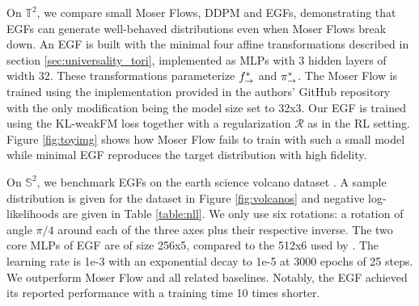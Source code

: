 \documentclass{article}
\theoremstyle{plain}
\theoremstyle{definition}
\theoremstyle{remark}
\theoremstyle{fact}
\begin{document}
 On $\mathbb{T}^2$, we compare small Moser Flows, DDPM and EGFs, demonstrating that EGFs can generate well-behaved distributions even when Moser Flows break down.
 An EGF is built with the minimal four affine transformations described in section \ref{sec:universality_tori}, implemented as MLPs with 3 hidden layers of width 32. These transformations parameterize $f^*_{\rightarrow}$ and $\pi_{\rightarrow}^*$. The Moser Flow is trained using the implementation provided in the authors' GitHub repository \cite{mosergithub}  with the only modification being the model size set to 32x3. Our EGF is trained using the KL-weakFM loss together with a  regularization $\mathcal R$ as in the RL setting.
  Figure \ref{fig:toyimg} shows how Moser Flow fails to train with such a small model while minimal EGF reproduces the target distribution with high fidelity.

  On $\mathbb S^2$, we benchmark EGFs on the earth science volcano dataset \cite{volcano}. A sample distribution is given for the dataset in Figure \ref{fig:volcanos} and negative log-likelihoods are given in Table \ref{table:nll}. We only use six rotations: a rotation of angle $\pi/4$ around each of the three axes plus their respective inverse.  The two core MLPs of EGF are of size 256x5, compared to the 512x6 used by \citet{rozen2021moser}. The learning rate is 1e-3 with an exponential decay to 1e-5 at 3000 epochs of 25 steps.  We outperform Moser Flow and all related baselines. Notably, the EGF achieved its reported performance with a training time 10 times shorter.
\end{document}
